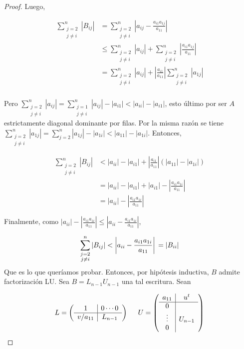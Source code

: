 \begin{propo}
\begin{proof}
Luego,

\begin{align*}
\sum_{\substack{j = 2\\ j \neq i}}^n |B_{ij}| & = \sum_{\substack{j = 2\\ j \neq i}}^n \left|a_{ij} - \frac{a_{i1}a_{1j}}{a_{11}}\right|\\
& \leq \sum_{\substack{j = 2\\ j \neq i}}^n |a_{ij}| + \sum_{\substack{j = 2\\ j \neq i}}^n \left|\frac{a_{i1}a_{1j}}{a_{11}}\right|\\
& = \sum_{\substack{j = 2\\ j \neq i}}^n |a_{ij}| + \left|\frac{a_{i1}}{a_{11}}\right| \sum_{\substack{j = 2\\ j \neq i}}^n \left|a_{1j}\right|\\
\end{align*}

Pero $\sum_{\substack{j = 2\\ j \neq i}}^n |a_{ij}| = \sum_{\substack{j = 1\\ j \neq i}}^n |a_{ij}| - |a_{i1}| < |a_{ii}| - |a_{i1}|$, esto último por ser $A$ estrictamente diagonal dominante por filas. Por la misma razón se tiene $\sum_{\substack{j = 2\\ j \neq i}}^n |a_{1j}| = \sum_{j = 2}^n |a_{1j}| - |a_{1i}| < |a_{11}| - |a_{1i}|$. Entonces,

\begin{align*}
\sum_{\substack{j = 2\\ j \neq i}}^n |B_{ij}| & < |a_{ii}| - |a_{i1}| + \left|\frac{a_{i1}}{a_{11}}\right|(|a_{11}| - |a_{1i}|)\\
& = |a_{ii}| - |a_{i1}| + |a_{i1}| - \left|\frac{a_{i1} a_{1i}}{a_{11}}\right|\\
& = |a_{ii}| - \left|\frac{a_{i1} a_{1i}}{a_{11}}\right|
\end{align*}

Finalmente, como $|a_{ii}| - \left|\frac{a_{i1} a_{1i}}{a_{11}}\right| \leq \left|a_{ii} - \frac{a_{i1} a_{1i}}{a_{11}}\right|$,

\[\sum_{\substack{j = 2\\ j \neq i}}^n |B_{ij}| < \left|a_{ii} - \frac{a_{i1} a_{1i}}{a_{11}}\right|\\
= |B_{ii}|\]
Que es lo que queríamos probar. Entonces, por hipótesis inductiva, $B$ admite factorización LU. Sea $B = L_{n - 1} U_{n - 1}$ una tal escritura. Sean

\[L = \left(\begin{array}{c|c}
1 & 0 \cdots 0\\ \hline
v / a_{11} & L_{n - 1} 
\end{array}\right)
\hspace{0.5cm}
U = \left(\begin{array}{c|c}
a_{11} & u^t\\ \hline
0 & \\
\vdots & U_{n - 1}\\
0 &
\end{array}\right)
\]


\end{proof}
\end{propo}
